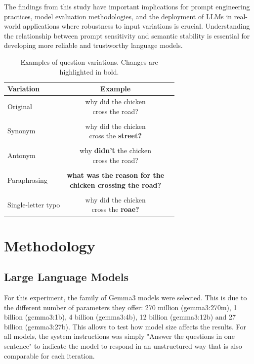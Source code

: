 \documentclass[a4paper,
               ]{jacow}
\begin{document}
The findings from this study have important implications for prompt engineering practices, model evaluation methodologies, and the deployment of LLMs in real-world applications where robustness to input variations is crucial. Understanding the relationship between prompt sensitivity and semantic stability is essential for developing more reliable and trustworthy language models.
\begin{table}[!hbt]
   \centering
   \caption{Examples of question variations. Changes are highlighted in bold.}
   \begin{tabular}{lcc}
       \toprule
       \textbf{Variation} & \textbf{Example}\\
       \midrule
           Original         & \makecell{why did the chicken \\cross the road?}\\ \\
          Synonym       & \makecell{why did the chicken \\cross the \textbf{street?}}\\ \\
           Antonym        & \makecell{why \textbf{didn't} the chicken \\cross the road?}\\ \\
           Paraphrasing       & \makecell{\textbf{what was the reason for the } \\ \textbf{chicken crossing the road?}}\\ \\
           Single-letter typo       & \makecell{why did the chicken \\cross the \textbf{roae?}}\\
       \bottomrule
   \end{tabular}
   \label{tab:questioni_variations}
\end{table}
\section{Methodology}
\subsection{Large Language Models}
For this experiment, the family of Gemma3 models were selected. This is due to the different number of parameters they offer: 270 million (gemma3:270m), 1 billion (gemma3:1b), 4 billion (gemma3:4b), 12 billion (gemma3:12b) and 27 billion (gemma3:27b). This allows to test how model size affects the results. For all models, the system instructions was simply "Answer the questions in one sentence" to indicate the model to respond in an unstructured way that is also comparable for each iteration.
\end{document}

